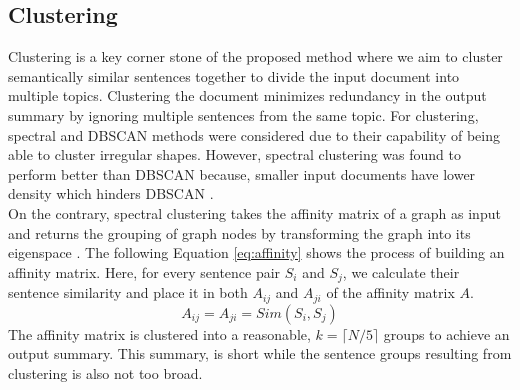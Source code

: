 \documentclass[acmlarge]{acmart}
\begin{document}

\subsection{Clustering}\label{subsec:clustering}
Clustering is a key corner stone of the proposed method where we aim to cluster semantically similar sentences together to divide the input document into multiple topics. Clustering the document minimizes redundancy in the output summary by ignoring multiple sentences from the same topic. For clustering, spectral and DBSCAN methods were considered due to their capability of being able to cluster irregular shapes. However, spectral clustering was found to perform better than DBSCAN because, smaller input documents have lower density which hinders DBSCAN \cite{roychowdhury-etal-2022-spectral-base}.\\

On the contrary, spectral clustering takes the affinity matrix of a graph as input and returns the grouping of graph nodes by transforming the graph into its eigenspace \cite{vonLuxburg-2007-spectral-tutorial}. The following Equation \ref{eq:affinity} shows the process of building an affinity matrix. Here, for every sentence pair $S_i$ and $S_j$, we calculate their sentence similarity and place it in both $A_{ij}$ and $A_{ji}$ of the affinity matrix $A$.
\begin{equation}\label{eq:affinity}
	A_{ij}=A_{ji}=Sim(S_i,S_j)
\end{equation}
The affinity matrix is clustered into a reasonable, $k=\lceil N/5 \rceil$ groups to achieve an output summary. This summary, is short while the sentence groups resulting from clustering is also not too broad.
\end{document}
